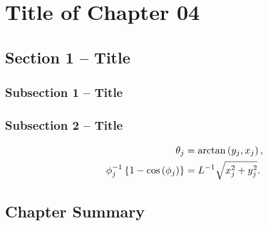 \chapter{Title of Chapter 04 \label{C4:Modeling}}

\section{Section 1 -- Title \label{sec:C4_HSRModeling}}

\subsection{Subsection 1 -- Title\label{subsec:C4_ForwardKinematics}}

\lipsum[1] 

\subsection{Subsection 2 -- Title\label{subsec:C4_HSR_IK}}

\lipsum[1] 
 
%
\begin{subequations}
	\begin{align}
		\theta_{j} & =\arctan\left(y_{j},x_{j}\right),\label{eq:ik_theta}\\
		\phi_{j}^{-1}\left\{1-\cos\left(\phi_{j}\right)\right\} & =L^{-1}\sqrt{x_{j}^{2}+y_{j}^{2}}.\label{eq:C4ik_phi}
	\end{align}
	\label{eq:C4xy_ik}
	\vspace{-4mm}
\end{subequations}


\section{Chapter Summary} \label{sec:C4_chapsummary}

\lipsum[1] 
